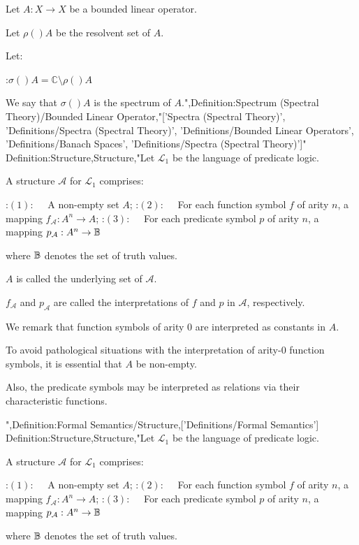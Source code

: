 Let $A : X \to X$ be a bounded linear operator.

Let $\rho \left(   \right)A$ be the resolvent set of $A$. 

Let: 

:$\sigma \left(   \right)A = \mathbb C \setminus \rho \left(   \right)A$


We say that $\sigma \left(   \right)A$ is the spectrum of $A$.",Definition:Spectrum (Spectral Theory)/Bounded Linear Operator,"['Spectra (Spectral Theory)', 'Definitions/Spectra (Spectral Theory)', 'Definitions/Bounded Linear Operators', 'Definitions/Banach Spaces', 'Definitions/Spectra (Spectral Theory)']"
Definition:Structure,Structure,"Let $\mathcal L_1$ be the language of predicate logic.


A structure $\mathcal A$ for $\mathcal L_1$ comprises:

:$(1): \quad$ A non-empty set $A$;
:$(2): \quad$ For each function symbol $f$ of arity $n$, a mapping $f_\mathcal A: A^n \to A$;
:$(3): \quad$ For each predicate symbol $p$ of arity $n$, a mapping $p_\mathcal A: A^n \to \Bbb B$

where $\Bbb B$ denotes the set of truth values.

$A$ is called the underlying set of $\mathcal A$.

$f_\mathcal A$ and $p_\mathcal A$ are called the interpretations of $f$ and $p$ in $\mathcal A$, respectively.


We remark that function symbols of arity $0$ are interpreted as constants in $A$.

To avoid pathological situations with the interpretation of arity-$0$ function symbols, it is essential that $A$ be non-empty.

Also, the predicate symbols may be interpreted as relations via their characteristic functions.



",Definition:Formal Semantics/Structure,['Definitions/Formal Semantics']
Definition:Structure,Structure,"Let $\mathcal L_1$ be the language of predicate logic.


A structure $\mathcal A$ for $\mathcal L_1$ comprises:

:$(1): \quad$ A non-empty set $A$;
:$(2): \quad$ For each function symbol $f$ of arity $n$, a mapping $f_\mathcal A: A^n \to A$;
:$(3): \quad$ For each predicate symbol $p$ of arity $n$, a mapping $p_\mathcal A: A^n \to \Bbb B$

where $\Bbb B$ denotes the set of truth values.


